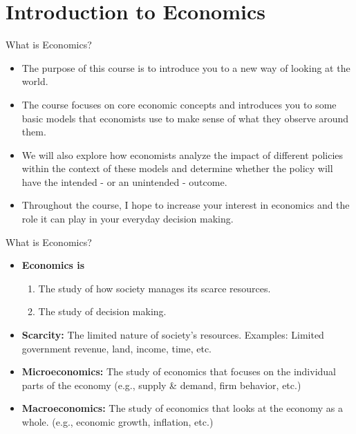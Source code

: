 \documentclass[xcolor={dvipsnames},pdf, hyperref={colorlinks=true, citecolor=ForestGreen, linkcolor=BlueViolet, urlcolor=Magenta}]{beamer}
\newcommand{\defn}[1]{\textbf{#1}}
\begin{document}
\section{Introduction to Economics}

\begin{frame}{What is Economics?}
	
\begin{itemize}
	\item The purpose of this course is to introduce you to a new way of looking at the world. 
	\item The course focuses on core economic concepts and introduces you to some basic models that economists use to make sense of what they observe around them. 
	\item We will also explore how economists analyze the impact of different policies within the context of these models and determine whether the policy will have the intended - or an unintended - outcome. 
	\item Throughout the course, I hope to increase your interest in economics and the role it can play in your everyday decision making.
\end{itemize}
	
\end{frame}

\begin{frame}{What is Economics?}
\begin{itemize}
	\item \defn{Economics is}
	\begin{enumerate}
		\item The study of how society manages its scarce resources.
		\item The study of decision making.
	\end{enumerate}

	\item \defn{Scarcity:} The limited nature of society's resources. Examples: Limited government revenue, land, income, time, etc.
	
	
\item	\defn{Microeconomics:} The study of economics that focuses on the individual parts of the economy (e.g., supply \& demand, firm behavior, etc.)

\item \defn{Macroeconomics:}  The study of economics that looks at the economy as a whole. (e.g., economic growth, inflation, etc.)
\end{itemize}
\end{frame}
\end{document}

